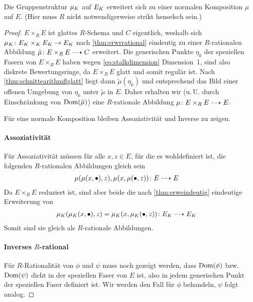 \begin{Lemma}
  Die Gruppenstruktur $\mu_{K}$ auf $E_{K}$ erweitert sich zu einer
  normalen Komposition $\mu$ auf $E$.
  (Hier muss $R$ nicht notwendigerweise strikt henselsch sein.)
  \begin{proof}
    $E\times_R E$ ist glattes $R$-Schema und $C$ eigentlich,
    weshalb sich $\mu_{K}\colon E_{K}\times_{K} E_{K}\to E_{K}$ nach
    \ref{thm:erwrrational} eindeutig zu einer $R$-rationalen
    Abbildung $\tilde\mu\colon E\times_R E\dashrightarrow C$ erweitert.
    Die generischen Punkte $\eta_k$ der speziellen Fasern von
    $E\times_R E$ haben wegen \ref{eq:stalkdimension}
    Dimension~1, sind also diskrete Bewertungsringe, da
    $E\times_R E$ glatt und somit regulär ist. Nach
    \ref{thm:schnittearithmflglatt} liegt dann
    $\tilde\mu(\eta_k)$ und entsprechend das Bild einer offenen
    Umgebung von $\eta_k$ unter $\tilde\mu$ in $E$. Daher erhalten
    wir (u.\,U. durch Einschränkung von $\operatorname{Dom}(\tilde\mu)$) eine
    $R$-rationale Abbildung $\mu\colon E\times_R E\dashrightarrow E$.

    Für eine normale Komposition bleiben Assoziativität und Inverse zu
    zeigen.

    \paragraph{Assoziativität}
    Für Assoziativität müssen für alle $x, z\in E$, für die es
    wohldefiniert ist, die folgenden $R$-rationalen 
    Abbildungen gleich sein
    \begin{gather*}
      \mu(\mu(x,\bullet),z), \mu(x,\mu(\bullet,z))
      \colon E \dashrightarrow E
    \end{gather*}
    Da $E\times_R E$ reduziert ist, sind aber beide die nach
    \ref{thm:erweindeutig} eindeutige Erweiterung von
    \begin{gather*}
      \mu_{K}(\mu_{K}(x,\bullet),z)=\mu_{K}(x,\mu_{K}(\bullet,z))
      \colon E_{K} \dashrightarrow E_{K}
    \end{gather*}
    Somit sind sie gleich als $R$-rationale Abbildungen.
    
    \paragraph{Inverses $R$-rational}
    Für $R$-Rationalität von $\phi$ und $\psi$ muss noch gezeigt
    werden, dass $\operatorname{Dom}(\phi)$ bzw. $\operatorname{Dom}(\psi)$ dicht in der
    speziellen Faser von $E$ ist, also in jedem generischen Punkt
    der speziellen Faser definiert ist.
    Wir werden den Fall für $\phi$ behandeln, $\psi$ folgt analog.
    

\end{proof}
\end{Lemma}
